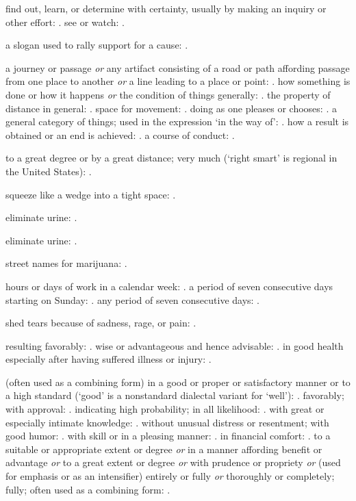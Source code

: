   find out, learn, or determine with certainty, usually by making an inquiry or other effort: . see or watch: .

  a slogan used to rally support for a cause: .

  a journey or passage \textit{or} any artifact consisting of a road or path affording passage from one place to another \textit{or} a line leading to a place or point: . how something is done or how it happens \textit{or} the condition of things generally: . the property of distance in general: . space for movement: . doing as one pleases or chooses: . a general category of things; used in the expression `in the way of': . how a result is obtained or an end is achieved: . a course of conduct: .

  to a great degree or by a great distance; very much (`right smart' is regional in the United States): .

  squeeze like a wedge into a tight space: .

  eliminate urine: .

  eliminate urine: .

  street names for marijuana: .

  hours or days of work in a calendar week: . a period of seven consecutive days starting on Sunday: . any period of seven consecutive days: .

  shed tears because of sadness, rage, or pain: .

  resulting favorably: . wise or advantageous and hence advisable: . in good health especially after having suffered illness or injury: .

  (often used as a combining form) in a good or proper or satisfactory manner or to a high standard (`good' is a nonstandard dialectal variant for `well'): . favorably; with approval: . indicating high probability; in all likelihood: . with great or especially intimate knowledge: . without unusual distress or resentment; with good humor: . with skill or in a pleasing manner: . in financial comfort: . to a suitable or appropriate extent or degree \textit{or} in a manner affording benefit or advantage \textit{or} to a great extent or degree \textit{or} with prudence or propriety \textit{or} (used for emphasis or as an intensifier) entirely or fully \textit{or} thoroughly or completely; fully; often used as a combining form: .

